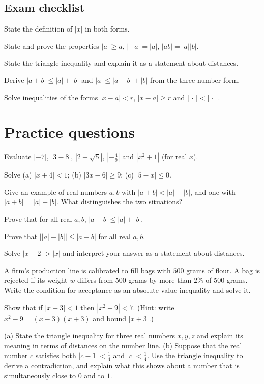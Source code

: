 \subsection*{Exam checklist}
\begin{checklist}
  \item State the definition of $|x|$ in both forms.
  \item State and prove the properties $|a|\ge a$, $|{-a}|=|a|$, $|ab|=|a||b|$.
  \item State the triangle inequality and explain it as a statement about distances.
  \item Derive $|a+b|\le|a|+|b|$ and $|a|\le|a-b|+|b|$ from the three-number form.
  \item Solve inequalities of the forms $|x-a|<r$, $|x-a|\ge r$ and $|\,\cdot\,|<|\,\cdot\,|$.
\end{checklist}

\section{Practice questions}
\pq[basic] Evaluate $|-7|$, $|3-8|$, $|2-\sqrt5|$, $|-\tfrac{4}{9}|$ and $|x^2+1|$ (for real $x$).

\pq[basic] Solve (a) $|x+4|<1$; (b) $|3x-6|\ge 9$; (c) $|5-x|\le 0$.

\pq[conceptual] Give an example of real numbers $a,b$ with $|a+b|<|a|+|b|$, and one with $|a+b|=|a|+|b|$. What
distinguishes the two situations?

\pq[mathematical] Prove that for all real $a,b$, $|a-b|\le|a|+|b|$.

\pq[mathematical] Prove that $\big||a|-|b|\big|\le|a-b|$ for all real $a,b$.

\pq[mathematical] Solve $|x-2|>|x|$ and interpret your answer as a statement about distances.

\pq[application] A firm's production line is calibrated to fill bags with $500$ grams of flour. A bag is rejected
if its weight $w$ differs from $500$ grams by more than $2\%$ of $500$ grams. Write the condition for acceptance as an
absolute-value inequality and solve it.

 Show that if $|x-3|<1$ then $|x^2-9|<7$. (Hint: write $x^2-9=(x-3)(x+3)$ and bound $|x+3|$.)

 (a) State the triangle inequality for three real numbers $x,y,z$ and explain its meaning in terms of
distances on the number line.
(b) Suppose that the real number $c$ satisfies both $|c-1|<\tfrac14$ and $|c|<\tfrac14$. Use the triangle inequality to
derive a contradiction, and explain what this shows about a number that is simultaneously close to $0$ and to $1$.

